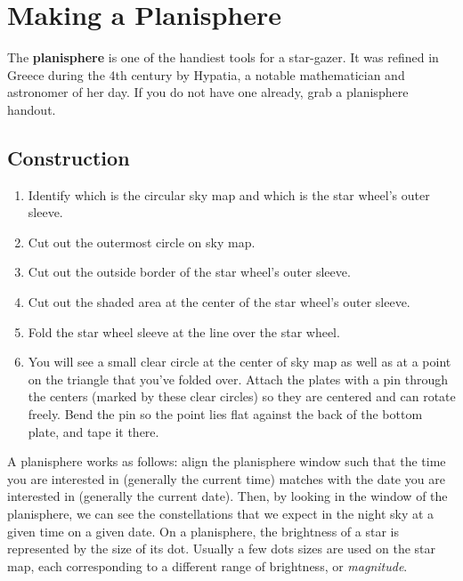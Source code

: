 \documentclass[11pt]{article}
\begin{document}
\section{Making a Planisphere}

The \textbf{planisphere} is one of the handiest tools for a star-gazer. It was refined in Greece during the 4th century by Hypatia, a notable mathematician and astronomer of her day.  If you do not have one already, grab a planisphere handout.

\subsection{Construction}
\begin{enumerate}[label=Step \arabic*:]
    \item Identify which is the circular sky map and which is the star wheel's outer sleeve.
    \item Cut out the outermost circle on sky map.
    \item Cut out the outside border of the star wheel's outer sleeve.
    \item Cut out the shaded area at the center of the star wheel's outer sleeve.
    \item Fold the star wheel sleeve at the line over the star wheel.
    \item You will see a small clear circle at the center of sky map as well as at a point on the triangle that you've folded over. Attach the plates with a pin through the centers (marked by these clear circles) so they are centered and can rotate freely. Bend the pin so the point lies flat against the back of the bottom plate, and tape it there.
\end{enumerate}

A planisphere works as follows: align the planisphere window such that the time you are interested in (generally the current time) matches with the date you are interested in (generally the current date). Then, by looking in the window of the planisphere, we can see the constellations that we expect in the night sky at a given time on a given date. On a planisphere, the brightness of a star is represented by the size of its dot. Usually a few dots sizes are used on the star map, each corresponding to a different range of brightness, or \textit{magnitude}.
\end{document}
